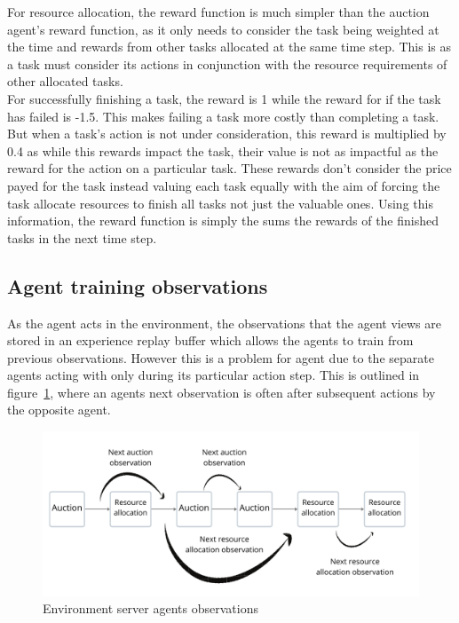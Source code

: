 For resource allocation, the reward function is much simpler than the auction agent's reward function, as it only needs
to consider the task being weighted at the time and rewards from other tasks allocated at the same time step. This is
as a task must consider its actions in conjunction with the resource requirements of other allocated tasks. \\
For successfully finishing a task, the reward is 1 while the reward for if the task has failed is -1.5. This makes
failing a task more costly than completing a task. But when a task's action is not under consideration, this reward is
multiplied by 0.4 as while this rewards impact the task, their value is not as impactful as the reward for the action
on a particular task. These rewards don't consider the price payed for the task instead valuing each task equally with
the aim of forcing the task allocate resources to finish all tasks not just the valuable ones. Using this information,
the reward function is simply the sums the rewards of the finished tasks in the next time step.

\subsection{Agent training observations}\label{subsec:agent-training-observations}
As the agent acts in the environment, the observations that the agent views are stored in an experience replay buffer
which allows the agents to train from previous observations. However this is a problem for agent due to the separate
agents acting with only during its particular action step. This is outlined in figure~\ref{fig:environment-observations},
where an agents next observation is often after subsequent actions by the opposite agent.

\begin{figure}
    \centering
    \includegraphics[width=14cm]{figures/env_server_agents_observations.pdf}
    \caption{Environment server agents observations}
    \label{fig:environment-observations}
\end{figure}

